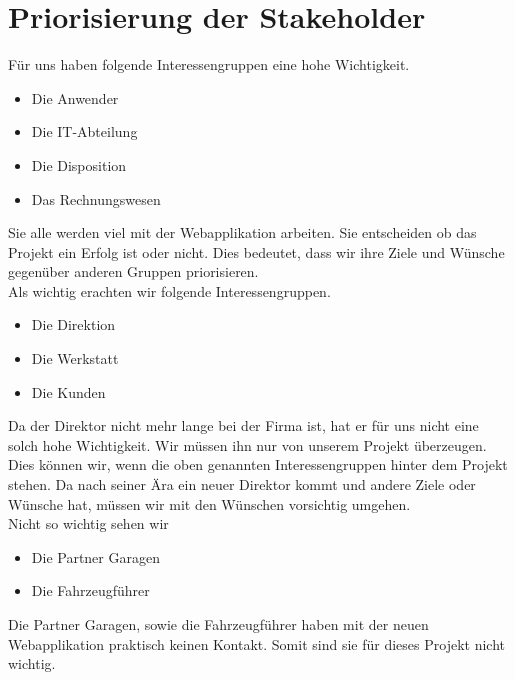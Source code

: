 \section{Priorisierung der Stakeholder}
Für uns haben folgende Interessengruppen eine hohe Wichtigkeit.
\begin{itemize}
\item Die Anwender
\item Die IT-Abteilung
\item Die Disposition
\item Das Rechnungswesen
\end{itemize}
%
Sie alle werden viel mit der Webapplikation arbeiten. Sie entscheiden ob das Projekt ein Erfolg ist oder nicht. Dies bedeutet, dass wir ihre Ziele und Wünsche gegenüber anderen Gruppen priorisieren.\\[2ex]
%
Als wichtig erachten wir folgende Interessengruppen.
\begin{itemize}
\item Die Direktion
\item Die Werkstatt
\item Die Kunden
\end{itemize}
%
Da der Direktor nicht mehr lange bei der Firma ist, hat er für uns nicht eine solch hohe Wichtigkeit. Wir müssen ihn nur von unserem Projekt überzeugen. Dies können wir, wenn die oben genannten Interessengruppen hinter dem Projekt stehen. Da nach seiner Ära ein neuer Direktor kommt und andere Ziele oder Wünsche hat, müssen wir mit den Wünschen vorsichtig umgehen.\\[2ex]
%
Nicht so wichtig sehen wir
\begin{itemize}
\item Die Partner Garagen
\item Die Fahrzeugführer
\end{itemize}
%
Die Partner Garagen, sowie die Fahrzeugführer haben mit der neuen Webapplikation praktisch keinen Kontakt. Somit sind sie für dieses Projekt nicht wichtig.